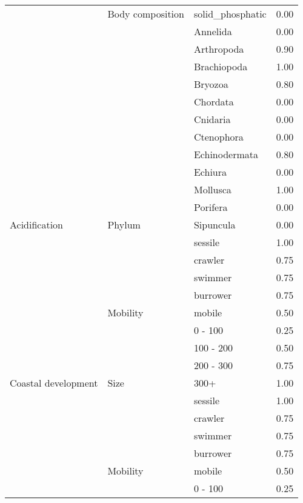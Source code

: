 \documentclass[
  12pt,
]{article}
\begin{document}
\begin{longtable}{llll}
\cmidrule{3-4}
 & \multirow{-13}{*}{\raggedright\arraybackslash Body composition} & solid\_phosphatic & 0.00\\
\cmidrule{2-4}
 &  & Annelida & 0.00\\
\cmidrule{3-4}
 &  & Arthropoda & 0.90\\
\cmidrule{3-4}
 &  & Brachiopoda & 1.00\\
\cmidrule{3-4}
 &  & Bryozoa & 0.80\\
\cmidrule{3-4}
 &  & Chordata & 0.00\\
\cmidrule{3-4}
 &  & Cnidaria & 0.00\\
\cmidrule{3-4}
 &  & Ctenophora & 0.00\\
\cmidrule{3-4}
 &  & Echinodermata & 0.80\\
\cmidrule{3-4}
 &  & Echiura & 0.00\\
\cmidrule{3-4}
 &  & Mollusca & 1.00\\
\cmidrule{3-4}
 &  & Porifera & 0.00\\
\cmidrule{3-4}
\multirow{-36}{*}{\raggedright\arraybackslash Acidification} & \multirow{-12}{*}{\raggedright\arraybackslash Phylum} & Sipuncula & 0.00\\
\cmidrule{1-4}
 &  & sessile & 1.00\\
\cmidrule{3-4}
 &  & crawler & 0.75\\
\cmidrule{3-4}
 &  & swimmer & 0.75\\
\cmidrule{3-4}
 &  & burrower & 0.75\\
\cmidrule{3-4}
 & \multirow{-5}{*}{\raggedright\arraybackslash Mobility} & mobile & 0.50\\
\cmidrule{2-4}
 &  & 0 - 100 & 0.25\\
\cmidrule{3-4}
 &  & 100 - 200 & 0.50\\
\cmidrule{3-4}
 &  & 200 - 300 & 0.75\\
\cmidrule{3-4}
\multirow{-9}{*}{\raggedright\arraybackslash Coastal development} & \multirow{-4}{*}{\raggedright\arraybackslash Size} & 300+ & 1.00\\
\cmidrule{1-4}
 &  & sessile & 1.00\\
\cmidrule{3-4}
 &  & crawler & 0.75\\
\cmidrule{3-4}
 &  & swimmer & 0.75\\
\cmidrule{3-4}
 &  & burrower & 0.75\\
\cmidrule{3-4}
 & \multirow{-5}{*}{\raggedright\arraybackslash Mobility} & mobile & 0.50\\
\cmidrule{2-4}
 &  & 0 - 100 & 0.25\\

\end{longtable}
\end{document}
